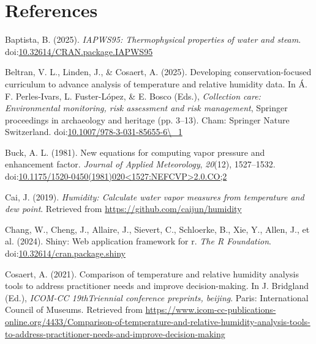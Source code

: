 \documentclass[
]{article}
\newlength{\cslhangindent}
\newenvironment{CSLReferences}[2] %
 {\begin{list}{}{%
  \setlength{\itemindent}{0pt}
  \setlength{\leftmargin}{0pt}
  \setlength{\parsep}{0pt}
  \ifodd #1
   \setlength{\leftmargin}{\cslhangindent}
   \setlength{\itemindent}{-1\cslhangindent}
  \fi
  \setlength{\itemsep}{#2\baselineskip}}}
 {\end{list}}
\begin{document}
\section*{References}\label{references}

\label{refs}
\begin{CSLReferences}{1}{0}
Baptista, B. (2025). \emph{IAPWS95: Thermophysical properties of water
and steam}.
doi:\href{https://doi.org/10.32614/CRAN.package.IAPWS95}{10.32614/CRAN.package.IAPWS95}

Beltran, V. L., Linden, J., \& Cosaert, A. (2025). Developing
conservation-focused curriculum to advance analysis of temperature and
relative humidity data. In Á. F. Perles-Ivars, L. Fuster-López, \& E.
Bosco (Eds.), \emph{Collection care: Environmental monitoring, risk
assessment and risk management}, Springer proceedings in archaeology and
heritage (pp. 3--13). Cham: Springer Nature Switzerland.
doi:\href{https://doi.org/10.1007/978-3-031-85655-6/_1}{10.1007/978-3-031-85655-6\textbackslash\_1}

Buck, A. L. (1981). New equations for computing vapor pressure and
enhancement factor. \emph{Journal of Applied Meteorology},
\emph{20}(12), 1527--1532.
doi:\href{https://doi.org/10.1175/1520-0450(1981)020\%3C1527:NEFCVP\%3E2.0.CO;2}{10.1175/1520-0450(1981)020\textless1527:NEFCVP\textgreater2.0.CO;2}

Cai, J. (2019). \emph{Humidity: Calculate water vapor measures from
temperature and dew point}. Retrieved from
\url{https://github.com/caijun/humidity}

Chang, W., Cheng, J., Allaire, J., Sievert, C., Schloerke, B., Xie, Y.,
Allen, J., et al. (2024). Shiny: Web application framework for r.
\emph{The R Foundation}.
doi:\href{https://doi.org/10.32614/cran.package.shiny}{10.32614/cran.package.shiny}

Cosaert, A. (2021). Comparison of temperature and relative humidity
analysis tools to address practitioner needs and improve
decision-making. In J. Bridgland (Ed.), \emph{{ICOM}-{CC}
{19thTriennial} conference preprints, beijing}. Paris: International
Council of Museums. Retrieved from
\url{https://www.icom-cc-publications-online.org/4433/Comparison-of-temperature-and-relative-humidity-analysis-tools-to-address-practitioner-needs-and-improve-decision-making}


\end{CSLReferences}
\end{document}
